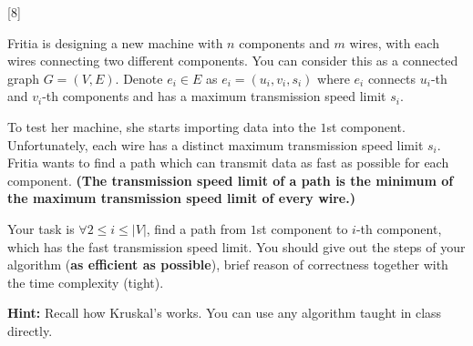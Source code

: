[8]

Fritia is designing a new machine with $n$ components and $m$ wires, with each wires connecting two different components. You can consider this as a connected graph $G=(V, E)$. 
Denote $e_i\in E$ as $e_i = (u_i,v_i,s_i)$ where $e_i$ connects $u_i$-th and $v_i$-th components and has a maximum transmission speed limit $s_i$.

To test her machine, she starts importing data into the $1$st component. Unfortunately, each wire has a distinct maximum transmission speed limit $s_i$. Fritia wants to find a path which can transmit data as fast as possible for each component. \textbf{(The transmission speed limit of a path is the minimum of the maximum transmission speed limit of every wire.)}

Your task is $\forall 2\leq i \leq |V|$, find a path from $1$st component to $i$-th component, which has the fast transmission speed limit. You should give out the steps of your algorithm (\textbf{as efficient as possible}), brief reason of correctness together with the time complexity (tight).

\textbf{Hint:} Recall how Kruskal's works. You can use any algorithm taught in class directly.

\begin{solution}

\end{solution}